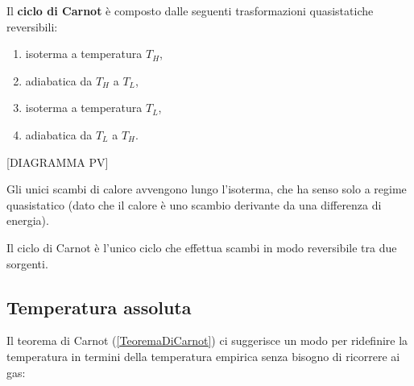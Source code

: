 \begin{definition}
Il \textbf{ciclo di Carnot} \`e composto dalle seguenti trasformazioni quasistatiche reversibili:
\begin{enumerate}
\item isoterma a temperatura $T_H$,
\item adiabatica da $T_H$ a $T_L$, 
\item isoterma a temperatura $T_L$,
\item adiabatica da $T_L$ a $T_H$.
\end{enumerate}
[DIAGRAMMA PV]
\end{definition}


\begin{remark}
Gli unici scambi di calore avvengono lungo l'isoterma, che ha senso solo a regime quasistatico (dato che il calore \`e uno scambio derivante da una differenza di energia).
\end{remark}

\begin{fact}
Il ciclo di Carnot \`e l'unico ciclo che effettua scambi in modo reversibile tra due sorgenti.
\end{fact}

\subsection{Temperatura assoluta}
Il teorema di Carnot (\ref{TeoremaDiCarnot}) ci suggerisce un modo per ridefinire la temperatura in termini della temperatura empirica senza bisogno di ricorrere ai gas:
\medskip


